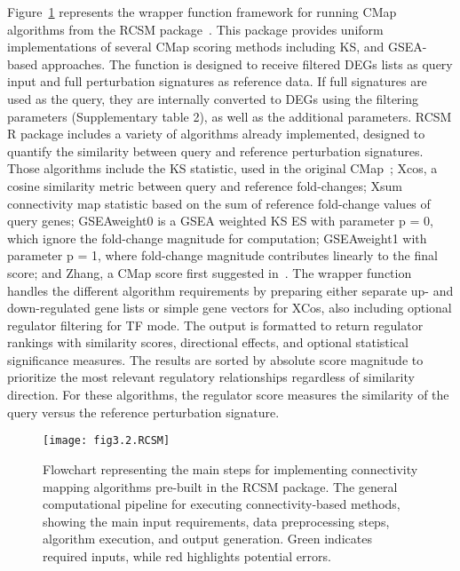 Figure~\ref{fig:fig3.2.RCSM} represents the wrapper function framework for running \gls{CMap} algorithms from the \gls{RCSM} package~\cite{RN79}. 
This package provides uniform implementations of several \gls{CMap} scoring methods including \gls{KS}, and \gls{GSEA}-based approaches. 
The function is designed to receive filtered \gls{DEGs} lists as query input and full perturbation signatures as reference data. 
If full signatures are used as the query, they are internally converted to \gls{DEGs} using the filtering parameters (Supplementary table 2), as well as the additional parameters. \gls{RCSM} \gls{R} package includes a variety of algorithms already implemented, designed to quantify the similarity between query and reference perturbation signatures. 
Those algorithms include the \gls{KS} statistic, used in the original \gls{CMap}~\cite{RN34}; Xcos, a cosine similarity metric between query and reference fold-changes; Xsum connectivity map statistic based on the sum of reference fold-change values of query genes; GSEAweight0 is a \gls{GSEA} weighted \gls{KS} \gls{ES} with parameter p = 0, which ignore the fold-change magnitude for computation; GSEAweight1 with parameter p = 1, where fold-change magnitude contributes linearly to the final score; and Zhang, a \gls{CMap} score first suggested in~\cite{RN161}. 
The wrapper function handles the different algorithm requirements by preparing either separate up- and down-regulated gene lists or simple gene vectors for XCos, also including optional regulator filtering for \gls{TF} mode. 
The output is formatted to return regulator rankings with similarity scores, directional effects, and optional statistical significance measures. 
The results are sorted by absolute score magnitude to prioritize the most relevant regulatory relationships regardless of similarity direction. 
For these algorithms, the regulator score measures the similarity of the query versus the reference perturbation signature.


\begin{figure}[htbp]
    \centering
    \texttt{[image: fig3.2.RCSM]}
    \caption[Flowchart representing the main steps for implementing connectivity mapping algorithms pre-built in the RCSM package.]{Flowchart representing the main steps for implementing connectivity mapping algorithms pre-built in the \gls{RCSM} package. The general computational pipeline for executing connectivity-based methods, showing the main input requirements, data preprocessing steps, algorithm execution, and output generation. Green indicates required inputs, while red highlights potential errors.}
    \label{fig:fig3.2.RCSM}
\end{figure}


